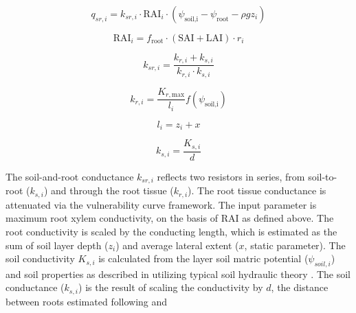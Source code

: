 \documentclass[draft,linenumbers]{agujournal}
\begin{document}
\begin{linenomath*} \begin{equation}
q_{sr,i} = k_{sr,i} \cdot  \text{RAI}_i  \cdot \left( \psi_{\text{soil,i}}-\psi_{\text{root}}-\rho g z_i\right)
\end{equation} \end{linenomath*}
\begin{linenomath*} \begin{equation}
\text{RAI}_i=f_{\text{root}} \cdot \left( \text{SAI} + \text{LAI} \right) \cdot r_i
\label{eq:rai}
\end{equation} \end{linenomath*}
\begin{linenomath*} \begin{equation}
k_{sr,i} = \dfrac{k_{r,i}+k_{s,i}}{k_{r,i}\cdot k_{s,i}}
\end{equation} \end{linenomath*}
\begin{linenomath*} \begin{equation}
k_{r,i} = \dfrac{K_{r,\text{max}}}{l_i} f \left(\psi_{\text{soil,i}}\right)
\end{equation} \end{linenomath*}
\begin{linenomath*} \begin{equation}
l_i = z_i + x
\end{equation} \end{linenomath*}
\begin{linenomath*} \begin{equation}
k_{s,i} = \dfrac{K_{s,i}}{d}
\end{equation} \end{linenomath*}

The soil-and-root conductance $k_{sr,i}$ reflects two resistors in series, from soil-to-root ($k_{s,i}$) and through the
root tissue ($k_{r,i}$).
The root tissue conductance is attenuated via the vulnerability curve framework. 
The input parameter is maximum root xylem conductivity, on the basis of RAI as defined above.
The root conductivity is scaled by the conducting length, which is estimated as the sum of soil layer depth ($z_i$)
and average lateral extent ($x$, static parameter).
The soil conductivity $K_{s,i}$ is calculated from the layer soil matric potential ($\psi_{soil,i}$) 
and soil properties as described in \citet{oleson2013} utilizing typical soil hydraulic theory \citep{brooks1964,clapp1978}.
The soil conductance ($k_{s,i}$) is the result of scaling the conductivity by $d$, 
 the distance between roots estimated following \citet{williams1996} and \citet{bonan2014}
\end{document}
